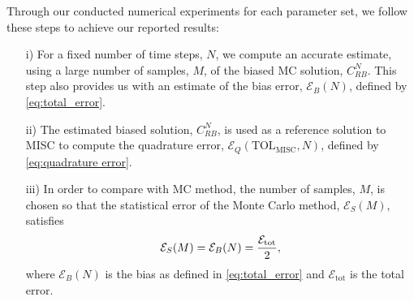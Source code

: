 Through our conducted numerical experiments for each parameter set, we follow these steps to achieve our reported results:

\begin{enumerate}
\item[i)] For a fixed number of time steps, $N$, we compute an accurate estimate, using a large number of samples, $M$, of the biased  MC solution, $C_{RB}^{N}$. This step also provides us with an estimate of the bias error, $\mathcal{E}_B(N)$, defined by \eqref{eq:total_error}. 
\item[ii)] The estimated  biased solution,  $C_{RB}^{N}$, is used as a reference solution  to MISC to compute the quadrature error, $\mathcal{E}_Q(\text{TOL}_{\text{MISC}},N)$, defined by \eqref{eq:quadrature error}.
\item[iii)] In order to compare with MC method, the number of samples, $M$, is chosen so that  the statistical error of the Monte Carlo  method, $\mathcal{E}_S(M)$, satisfies
\begin{align}\label{optimal_number_samples}
\mathcal{E}_S(M)= \mathcal{E}_B(N)=\frac{\mathcal{E}_{\text{tot}}}{2},
\end{align}
where $\mathcal{E}_B(N)$ is the bias as defined in \eqref{eq:total_error} and
$\mathcal{E}_{\text{tot}}$ is the total error. 
\end{enumerate}

